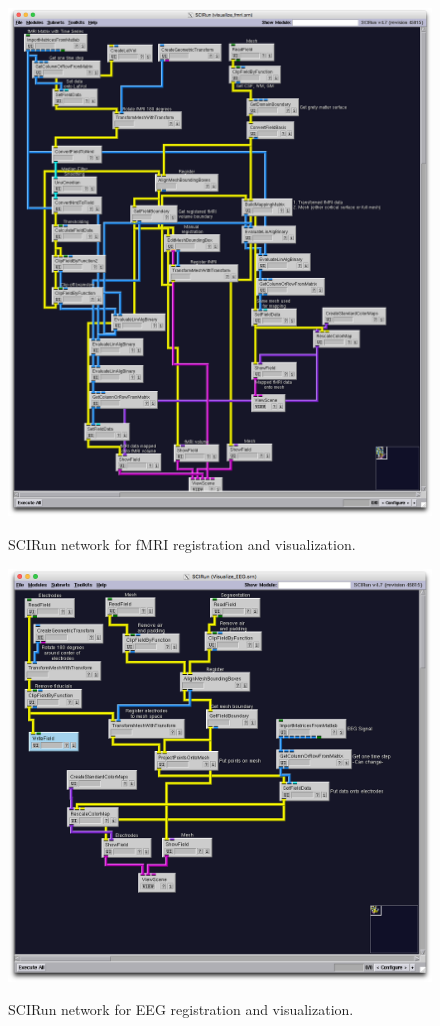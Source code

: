 \begin{figure}[p]
\begin{center}
\includegraphics[width=\textwidth]{Figures/fmri_network.png}\\
\caption{SCIRun network for fMRI registration and visualization.}
\label{fig:fmrivisnet}
\end{center}
\end{figure}

\begin{figure}[p]
\begin{center}
\includegraphics[width=\textwidth]{Figures/EEG_network.png}\\
\caption{SCIRun network for EEG registration and visualization.}
\label{fig:eegvisnet}
\end{center}
\end{figure} 